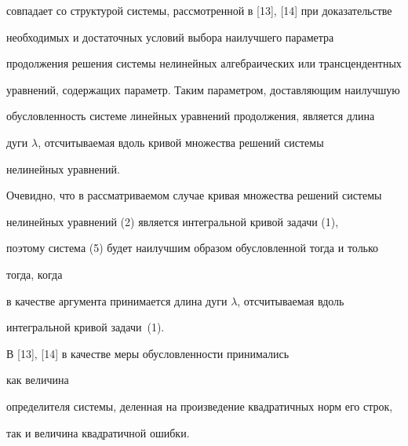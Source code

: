 \begin{pf}
совпадает со структурой системы, рассмотренной в [13], [14] при доказательстве


необходимых и достаточных условий выбора наилучшего параметра


продолжения решения системы нелинейных алгебраических или трансцендентных


уравнений, содержащих параметр. Таким параметром, доставляющим наилучшую


обусловленность системе линейных уравнений продолжения, является длина


дуги $\lambda$, отсчитываемая вдоль кривой множества решений системы


нелинейных уравнений.





Очевидно, что в рассматриваемом случае кривая множества решений системы


нелинейных уравнений (2) является интегральной кривой задачи (1),


поэтому система (5) будет наилучшим образом обусловленной тогда и только


тогда, когда


в качестве аргумента принимается длина дуги $\lambda$, отсчитываемая вдоль


интегральной кривой задачи~(1).


\end{pf}





\begin{note} В [13], [14] в качестве меры обусловленности принимались


как величина


определителя системы, деленная на произведение квадратичных норм его строк,


так и величина квадратичной ошибки.


\end{note}





